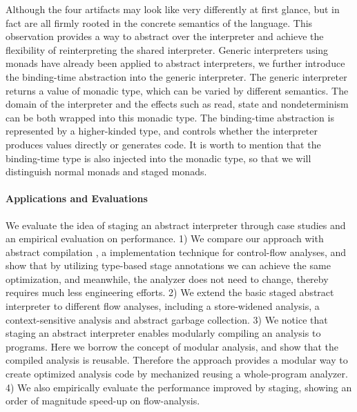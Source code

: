 Although the four artifacts may look like very differently at first
glance, but in fact are all firmly rooted in the concrete semantics of
the language.  This observation provides a way to abstract over the
interpreter and achieve the flexibility of reinterpreting the shared
interpreter. Generic interpreters using monads have already been
applied to abstract interpreters, we further introduce the
binding-time abstraction into the generic interpreter.  The generic
interpreter returns a value of monadic type, which can be varied by
different semantics. The domain of the interpreter and the effects
such as read, state and nondeterminism can be both wrapped into this
monadic type.  The binding-time abstraction is represented by a
higher-kinded type, and controls whether the interpreter produces
values directly or generates code. It is worth to mention that the
binding-time type is also injected into the monadic type, so that we
will distinguish normal monads and staged monads.

\paragraph{Applications and Evaluations}
We evaluate the idea of staging an abstract interpreter through
case studies and an empirical evaluation on performance.
1) We compare our approach with abstract compilation
\cite{Boucher:1996:ACN:647473.727587}, a implementation technique for
control-flow analyses, and show that by utilizing type-based stage
annotations we can achieve the same optimization, and meanwhile,
the analyzer does not need to change, thereby requires much less
engineering efforts.
2) We extend the basic staged abstract interpreter to different flow
analyses, including a store-widened analysis, a context-sensitive
analysis and abstract garbage collection.
3) We notice that staging an abstract interpreter enables modularly
compiling an analysis to programs. Here we borrow the concept of
modular analysis, and show that the compiled analysis is reusable.
Therefore the approach provides a modular way to create optimized
analysis code by mechanized reusing a whole-program analyzer.
4) We also empirically evaluate the performance improved by staging,
showing an order of magnitude speed-up on flow-analysis.

